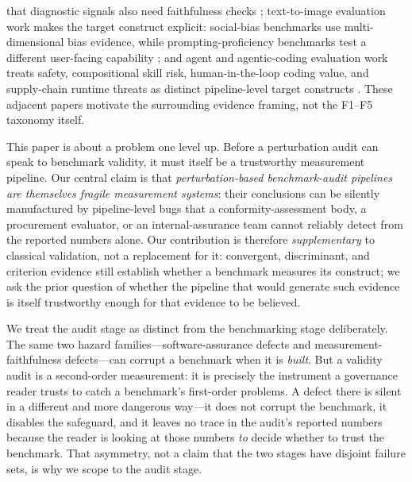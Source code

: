 that diagnostic signals also need faithfulness checks
\cite{lan-etal-2025-attention};
text-to-image evaluation work makes the target construct explicit:
social-bias benchmarks use multi-dimensional bias evidence, while
prompting-proficiency benchmarks test a different user-facing capability
\cite{luo2024bigbench,luo2026biasig,luo2024faintbench,
luo2026atelierevalagenticevaluationhumans}; and agent and
agentic-coding evaluation work treats safety, compositional skill risk,
human-in-the-loop coding value, and supply-chain runtime threats as
distinct pipeline-level target constructs \cite{luo2026agentauditor,
wang2026safeskillscollidemeasuring,
luo2026centaurevalbenchmarkinghumanintheloopvalue,
jiang2026soktaxonomyattackvectors}. These adjacent papers motivate
the surrounding evidence framing, not the F1--F5 taxonomy itself.

This paper is about a problem one level up. Before a perturbation
audit can speak to benchmark validity, it must itself be a trustworthy
measurement pipeline. Our central claim is that
\emph{perturbation-based benchmark-audit pipelines are themselves
fragile measurement systems}: their conclusions can be silently
manufactured by pipeline-level bugs that a conformity-assessment body,
a procurement evaluator, or an internal-assurance team cannot reliably
detect from the reported numbers alone. Our contribution is therefore
\emph{supplementary} to classical validation, not a replacement for
it: convergent, discriminant, and criterion evidence still establish
whether a benchmark measures its construct; we ask the prior question
of whether the pipeline that would generate such evidence is itself
trustworthy enough for that evidence to be believed.

We treat the audit stage as distinct from the benchmarking stage
deliberately. The same two hazard families---software-assurance
defects and measurement-faithfulness defects---can corrupt a
benchmark when it is \emph{built}. But a validity audit is a
second-order measurement: it is precisely the instrument a
governance reader trusts to catch a benchmark's first-order
problems. A defect there is silent in a different and more dangerous
way---it does not corrupt the benchmark, it disables the safeguard,
and it leaves no trace in the audit's reported numbers because the
reader is looking at those numbers \emph{to} decide whether to
trust the benchmark. That asymmetry, not a claim that the two
stages have disjoint failure sets, is why we scope to the audit
stage.

